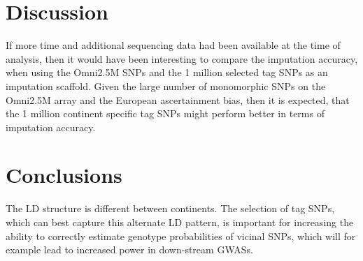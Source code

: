 \section{Discussion}
If more time and additional sequencing data had been available at the time of analysis, then it would have been interesting to compare the imputation accuracy, when using the Omni2.5M SNPs and the 1 million selected tag SNPs as an imputation scaffold. Given the large number of monomorphic SNPs on the Omni2.5M array and the European ascertainment bias, then it is expected, that the 1 million continent specific tag SNPs might perform better in terms of imputation accuracy.

\section{Conclusions}
The LD structure is different between continents. The selection of tag SNPs, which can best capture this alternate LD pattern, is important for increasing the ability to correctly estimate genotype probabilities of vicinal SNPs, which will for example lead to increased power in down-stream \glspl{GWAS}.